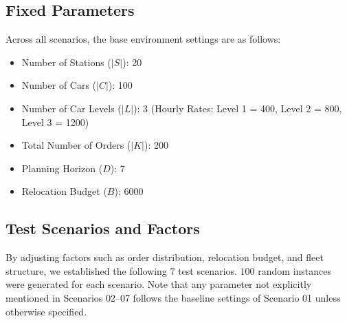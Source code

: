 \documentclass[12pt, a4paper]{article}
\begin{document}
\subsection{Fixed Parameters}
Across all scenarios, the base environment settings are as follows:
\begin{itemize}
    \item Number of Stations ($|S|$): 20
    \item Number of Cars ($|C|$): 100
    \item Number of Car Levels ($|L|$): 3 (Hourly Rates: Level 1 = 400, Level 2 = 800, Level 3 = 1200)
    \item Total Number of Orders ($|K|$): 200
    \item Planning Horizon ($D$): 7 
    \item Relocation Budget ($B$): 6000
\end{itemize}

\subsection{Test Scenarios and Factors}
By adjusting factors such as order distribution, relocation budget, and fleet structure, we established the following 7 test scenarios. $100$ random instances were generated for each scenario. Note that any parameter not explicitly mentioned in Scenarios 02--07 follows the baseline settings of Scenario 01 unless otherwise specified.
\end{document}
